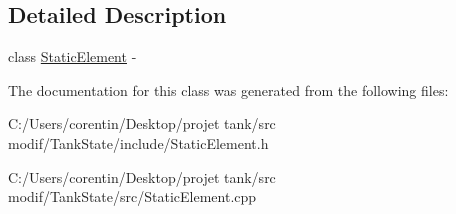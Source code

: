\subsection{Detailed Description}
class \hyperlink{classstate_1_1_static_element}{Static\+Element} -\/ 

The documentation for this class was generated from the following files\+:\begin{DoxyCompactItemize}
\item 
C\+:/\+Users/corentin/\+Desktop/projet tank/src modif/\+Tank\+State/include/Static\+Element.\+h\item 
C\+:/\+Users/corentin/\+Desktop/projet tank/src modif/\+Tank\+State/src/Static\+Element.\+cpp\end{DoxyCompactItemize}
